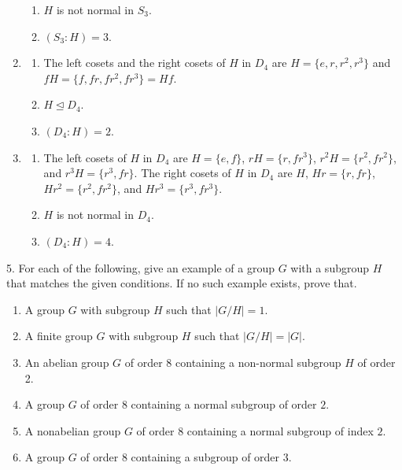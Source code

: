 \documentclass[10pt,]{book}
\theoremstyle{plain}
\theoremstyle{definition}
\theoremstyle{definition}
\theoremstyle{definition}
\theoremstyle{definition}
\numberwithin{equation}{section}
\begin{document}
\begin{exerciselist}
\begin{enumerate}[label=(\alph*)]
\begin{enumerate}[label=\roman*.]
\item\hypertarget{li-438}{}\(H\) is not normal in \(S_3\).%
\item\hypertarget{li-439}{}\((S_3:H)=3\).%
\end{enumerate}
%
\item\hypertarget{li-440}{}%
\begin{enumerate}[label=\roman*.]
\item\hypertarget{li-441}{}The left cosets and the right cosets of \(H\) in \(D_4\) are \(H=\{e,r,r^2,r^3\}\) and \(fH=\{f,fr, fr^2, fr^3\}=Hf\).%
\item\hypertarget{li-442}{}\(H\unlhd D_4\).%
\item\hypertarget{li-443}{}\((D_4:H)=2\).%
\end{enumerate}
%
\item\hypertarget{li-444}{}%
\begin{enumerate}[label=\roman*.]
\item\hypertarget{li-445}{}The left cosets of \(H\) in \(D_4\) are \(H=\{e,f\}\), \(rH=\{r,fr^3\}\), \(r^2H=\{r^2,fr^2\}\), and \(r^3H=\{r^3, fr\}\). The right cosets of \(H\) in \(D_4\) are \(H\), \(Hr=\{r, fr\}\), \(Hr^2=\{r^2,fr^2\}\), and \(Hr^3=\{r^3, fr^3\}\).%
\item\hypertarget{li-446}{}\(H\) is not normal in \(D_4\).%
\item\hypertarget{li-447}{}\((D_4:H)=4\).%
\end{enumerate}
%
\end{enumerate}
\item[5.]\hypertarget{exercise-54}{}For each of the following, give an example of a group \(G\) with a subgroup \(H\) that matches the given conditions. If no such example exists, prove that. \leavevmode%
\begin{enumerate}[label=(\alph*)]
\item\hypertarget{li-448}{}A group \(G\) with subgroup \(H\) such that \(|G/H|=1\).%
\item\hypertarget{li-449}{}A finite group \(G\) with subgroup \(H\) such that \(|G/H|=|G|\).%
\item\hypertarget{li-450}{}An abelian group \(G\) of order \(8\) containing a non-normal subgroup \(H\) of order 2.%
\item\hypertarget{li-451}{}A group \(G\) of order 8 containing a normal subgroup of order \(2\).%
\item\hypertarget{li-452}{}A nonabelian group \(G\) of order 8 containing a normal subgroup of index \(2\).%
\item\hypertarget{li-453}{}A group \(G\) of order 8 containing a subgroup of order \(3\).%

\end{enumerate}
\end{exerciselist}
\end{document}
